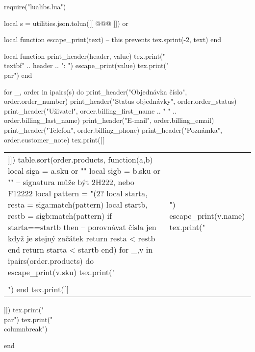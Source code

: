 \documentclass[landscape,a4page]{article}
\begin{document}
\columnseprule=0.3pt
\columnsep=20pt
\parindent=0pt
\parskip=4pt
\begin{multicols*}{3}

\begin{luacode*}
require("lualibs.lua")

local s =  utilities.json.tolua([[
@@@
]]) or {}



local function escape_print(text)
  -- this prevents
  tex.sprint(-2, text)
end

local function print_header(header, value)
  tex.print("\\textbf{" .. header .. ":} ")
  escape_print(value)
  tex.print("\\par")
end


for _, order in ipairs(s) do
  print_header("Objednávka číslo", order.order_number)
  print_header("Status objednávky", order.order_status)
  print_header("Uživatel", order.billing_first_name .. " " .. order.billing_last_name)
  print_header("E-mail", order.billing_email)
  print_header("Telefon", order.billing_phone)
  print_header("Poznámka", order.customer_note)
  tex.print([[
  \bigskip
  \begin{tabular}{p{.2\linewidth}p{.5\linewidth}}]])
  table.sort(order.products, function(a,b)
    local siga = a.sku or ""
    local sigb = b.sku or ""
    -- signatura může být 2H222, nebo F12222
    local pattern = "(2?%
    local starta, resta = siga:match(pattern)
    local startb, restb = sigb:match(pattern)
    if starta==startb then
      -- porovnávat čísla jen když je stejný začátek
      return resta < restb 
    end
    return starta < startb
  end)
  for _,v in ipairs(order.products) do
    escape_print(v.sku)
    tex.print("&")
    escape_print(v.name)
    tex.print("\\\\")
  end
  tex.print([[
  \end{tabular}

  \vfill
  \null
   
  ]])
  tex.print("\\par")
  tex.print("\\columnbreak")

end



\end{luacode*}
\end{multicols*}
\end{document}
